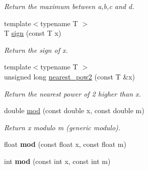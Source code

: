 \begin{DoxyCompactItemize}
\begin{DoxyCompactList}\small\item\em Return the maximum between {\ttfamily a},{\ttfamily b},{\ttfamily c} and {\ttfamily d}. \item\end{DoxyCompactList}\item 
\hypertarget{namespacecimg__library_1_1cimg_acb00b9ea45d7c523af71071eaad2fd98}{
{\footnotesize template$<$typename T $>$ }\\T \hyperlink{namespacecimg__library_1_1cimg_acb00b9ea45d7c523af71071eaad2fd98}{sign} (const T x)}
\label{namespacecimg__library_1_1cimg_acb00b9ea45d7c523af71071eaad2fd98}

\begin{DoxyCompactList}\small\item\em Return the sign of {\ttfamily x}. \item\end{DoxyCompactList}\item 
\hypertarget{namespacecimg__library_1_1cimg_a82202bb5c5c52020364951471bb1ae8f}{
{\footnotesize template$<$typename T $>$ }\\unsigned long \hyperlink{namespacecimg__library_1_1cimg_a82202bb5c5c52020364951471bb1ae8f}{nearest\_\-pow2} (const T \&x)}
\label{namespacecimg__library_1_1cimg_a82202bb5c5c52020364951471bb1ae8f}

\begin{DoxyCompactList}\small\item\em Return the nearest power of 2 higher than {\ttfamily x}. \item\end{DoxyCompactList}\item 
double \hyperlink{namespacecimg__library_1_1cimg_a1b6a62e8511af92513cc68dab1811769}{mod} (const double x, const double m)
\begin{DoxyCompactList}\small\item\em Return {\ttfamily x} modulo {\ttfamily m} (generic modulo). \item\end{DoxyCompactList}\item 
\hypertarget{namespacecimg__library_1_1cimg_a58ab78c1bf0caa5f8b03bcc9d91c1973}{
float {\bfseries mod} (const float x, const float m)}
\label{namespacecimg__library_1_1cimg_a58ab78c1bf0caa5f8b03bcc9d91c1973}

\item 
\hypertarget{namespacecimg__library_1_1cimg_a0462a16e4eb0938329844fb5dc819ca4}{
int {\bfseries mod} (const int x, const int m)}
\label{namespacecimg__library_1_1cimg_a0462a16e4eb0938329844fb5dc819ca4}


\end{DoxyCompactItemize}
